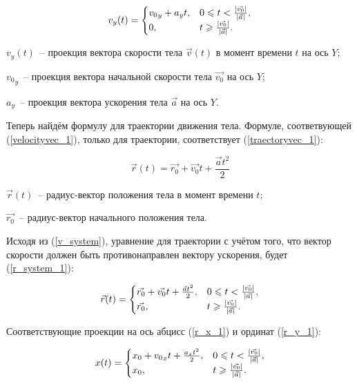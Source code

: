 \begin{equation}\label{v_y_1}
  v_y(t) =
  \begin{cases}
    {v_0}_y + a_y t, & 0  \leqslant t < \frac{\left|\vec{v_0}\right|}{\left|\vec{a}\right|}, \\
    0,               & t \geqslant \frac{\left|\vec{v_0}\right|}{\left|\vec{a}\right|}.
  \end{cases}
\end{equation}

\begin{Underequation}
  \(v_y(t)\)~-- проекция вектора скорости тела \(\vec{v}(t)\) в момент времени \(t\) на ось \(Y\);

  \({v_0}_y\)~-- проекция вектора начальной скорости тела \(\vec{v_0}\) на ось \(Y\);

  \(a_y\)~-- проекция вектора ускорения тела \(\vec{a}\) на ось \(Y\).
\end{Underequation}

Теперь найдём формулу для траектории движения тела. Формуле, соответвующей (\ref{velocityvec_1}),
только для траектории, соответствует (\ref{traectoryvec_1}):

\begin{equation}\label{traectoryvec_1}
  \vec{r}(t) = \vec{r_0} + \vec{v_0}t + \frac{\vec{a}t^2}{2}
\end{equation}

\begin{Underequation}
  \(\vec{r}(t)\)~-- радиус-вектор положения тела в момент времени \(t\);

  \(\vec{r_0}\)~-- радиус-вектор начального положения тела.
\end{Underequation}

Исходя из (\ref{v_system}), уравнение для траектории с учётом того, что вектор скорости должен быть
противонаправлен вектору ускорения, будет (\ref{r_system_1}):

\begin{equation}\label{r_system_1}
  \vec{r}(t) = \begin{cases}
    \vec{r_0} + \vec{v_0}t + \frac{\vec{a}t^2}{2}, & 0 \leqslant t < \frac{\left|\vec{v_0}\right|}{\left|\vec{a}\right|}, \\
    \vec{r_0},                                     & t \geqslant \frac{\left|\vec{v_0}\right|}{\left|\vec{a}\right|} .
  \end{cases}
\end{equation}

Соответствующие проекции на ось абцисс (\ref{r_x_1}) и ординат (\ref{r_y_1}):

\begin{equation}\label{r_x_1}
  x(t) =
  \begin{cases}
    x_0 + {v_0}_x t + \frac{a_x t^2}{2}, & 0 \leqslant t < \frac{\left|\vec{v_0}\right|}{\left|\vec{a}\right|}, \\
    x_0,                                 & t \geqslant \frac{\left|\vec{v_0}\right|}{\left|\vec{a}\right|}.
  \end{cases}
\end{equation}

